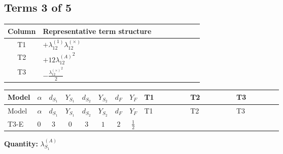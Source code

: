 \documentclass[8pt]{article}
\begin{document}
\begin{landscape}
\subsection*{Terms 3 of 5}
\begin{center}
\begin{tabular}{@{}c >{\raggedright\arraybackslash}p{0.82\linewidth}@{}}
\toprule
Column & Representative term structure \\
\midrule
T1 & \(\displaystyle +{\lambda_{12}^{(1)}} {\lambda_{12}^{(\times)}}\) \\
\midrule
T2 & \(\displaystyle +12 {\lambda_{12}^{(A)}}^2\) \\
\midrule
T3 & \(\displaystyle -\frac{{\lambda_{12}^{(\times)}}^2}{2}\) \\
\midrule
\bottomrule
\end{tabular}
\end{center}
\smallskip
\tiny
\begin{longtable}{@{}llcccccc >{\raggedright\arraybackslash}p{0.21\linewidth} >{\raggedright\arraybackslash}p{0.21\linewidth} >{\raggedright\arraybackslash}p{0.21\linewidth}@{}}
\toprule
Model & $\alpha$ & $d_{S_1}$ & $Y_{S_1}$ & $d_{S_2}$ & $Y_{S_2}$ & $d_F$ & $Y_F$ & T1 & T2 & T3 \\
\midrule
\endfirsthead
\toprule
Model & $\alpha$ & $d_{S_1}$ & $Y_{S_1}$ & $d_{S_2}$ & $Y_{S_2}$ & $d_F$ & $Y_F$ & T1 & T2 & T3 \\
\midrule
\endhead
T3-E & $0$ & $3$ & $0$ & $3$ & $1$ & $2$ & $\frac{1}{2}$ & \scriptsize\adjustbox{max width=\linewidth}{$\begin{gathered} +{\lambda_{12}^{(1)}} {\lambda_{12}^{(\times)}}\end{gathered}$} & \scriptsize\adjustbox{max width=\linewidth}{$\begin{gathered} +12 {\lambda_{12}^{(A)}}^2\end{gathered}$} & \scriptsize\adjustbox{max width=\linewidth}{$\begin{gathered} -\frac{{\lambda_{12}^{(\times)}}^2}{2}\end{gathered}$} \\
\midrule
\bottomrule
\end{longtable}
\clearpage
\noindent\textbf{Quantity: }$\lambda_{S_1}^{(A)}$\par\smallskip

\end{landscape}
\end{document}
